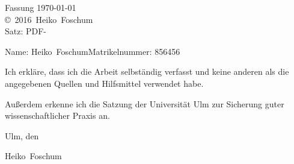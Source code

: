 \documentclass[a4paper,10pt,twoside,openright,DIV=15,BCOR25mm
]{scrbook}
\newcommand{\fullname}{Heiko~Foschum}
\newcommand{\jahr}{2016}
\newcommand{\matnr}{856456}
\begin{document}
\clearpage
\thispagestyle{empty}
{ \small
  \flushleft
  Fassung \today \\\vfill
  \copyright~\jahr~\fullname\\[0.5em]
  Satz: PDF-\LaTeXe
}



\tableofcontents

\mainmatter










\appendix
%

\backmatter


\nocite{*}
\listoffigures
\listoftables
\clearpage
\thispagestyle{empty}

Name: \fullname \hfill Matrikelnummer: \matnr \vspace{2cm}


Ich erkläre, dass ich die Arbeit selbständig verfasst und keine anderen als die angegebenen Quellen und Hilfsmittel verwendet habe.

Außerdem erkenne ich die Satzung der Universität Ulm zur Sicherung guter wissenschaftlicher Praxis an.\vspace{2cm}

Ulm, den \dotfill

\hspace{10cm} {\footnotesize \fullname}
\end{document}
